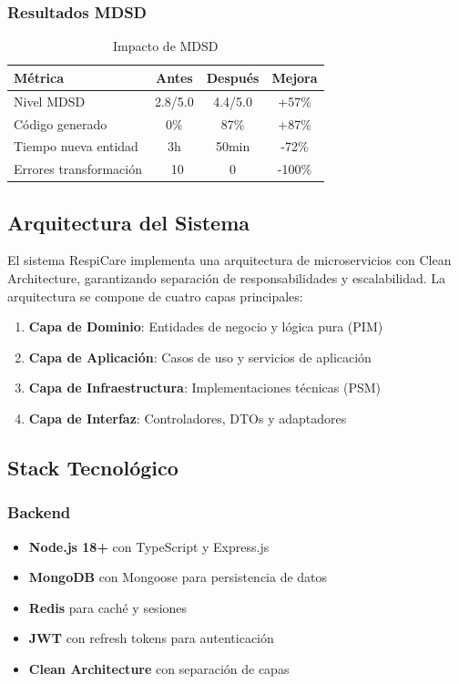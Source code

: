 \documentclass[12pt,a4paper]{article}
\begin{document}
\subsubsection{Resultados MDSD}

\begin{table}[H]
\centering
\caption{Impacto de MDSD}
\begin{tabular}{|l|c|c|c|}
\hline
\textbf{Métrica} & \textbf{Antes} & \textbf{Después} & \textbf{Mejora} \\
\hline
Nivel MDSD & 2.8/5.0 & 4.4/5.0 & +57\% \\
\hline
Código generado & 0\% & 87\% & +87\% \\
\hline
Tiempo nueva entidad & 3h & 50min & -72\% \\
\hline
Errores transformación & ~10 & 0 & -100\% \\
\hline
\end{tabular}
\end{table}

\subsection{Arquitectura del Sistema}

El sistema RespiCare implementa una arquitectura de microservicios con Clean Architecture, garantizando separación de responsabilidades y escalabilidad. La arquitectura se compone de cuatro capas principales:

\begin{enumerate}
    \item \textbf{Capa de Dominio}: Entidades de negocio y lógica pura (PIM)
    \item \textbf{Capa de Aplicación}: Casos de uso y servicios de aplicación
    \item \textbf{Capa de Infraestructura}: Implementaciones técnicas (PSM)
    \item \textbf{Capa de Interfaz}: Controladores, DTOs y adaptadores
\end{enumerate}

\subsection{Stack Tecnológico}

\subsubsection{Backend}
\begin{itemize}
    \item \textbf{Node.js 18+} con TypeScript y Express.js
    \item \textbf{MongoDB} con Mongoose para persistencia de datos
    \item \textbf{Redis} para caché y sesiones
    \item \textbf{JWT} con refresh tokens para autenticación
    \item \textbf{Clean Architecture} con separación de capas
\end{itemize}
\end{document}
